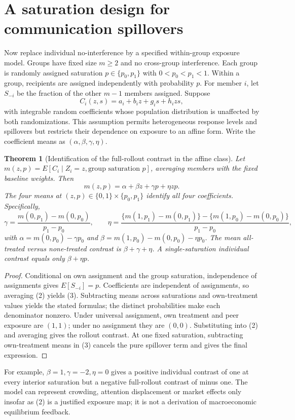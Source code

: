 \documentclass[11pt]{article}
\newtheorem{theorem}{Theorem}
\theoremstyle{definition}
\begin{document}
\section*{A saturation design for communication spillovers}
Now replace individual no-interference by a specified within-group exposure model. Groups have fixed size $m\ge2$ and no cross-group interference. Each group is randomly assigned saturation $p\in\{p_0,p_1\}$ with $0<p_0<p_1<1$. Within a group, recipients are assigned independently with probability $p$. For member $i$, let $S_{-i}$ be the fraction of the other $m-1$ members assigned. Suppose
\[
 C_i(z,s)=a_i+b_i z+g_i s+h_i zs,
 \tag{2}
\]
with integrable random coefficients whose population distribution is unaffected by both randomizations. This assumption permits heterogeneous response levels and spillovers but restricts their dependence on exposure to an affine form. Write the coefficient means as $(\alpha,\beta,\gamma,\eta)$.

\begin{theorem}[Identification of the full-rollout contrast in the affine class]
Let $m(z,p)=E[C_i\mid Z_i=z,\text{group saturation }p]$, averaging members with the fixed baseline weights. Then
\[
 m(z,p)=\alpha+\beta z+\gamma p+\eta zp.
 \tag{3}
\]
The four means at $(z,p)\in\{0,1\}\times\{p_0,p_1\}$ identify all four coefficients. Specifically,
\[
 \gamma=\frac{m(0,p_1)-m(0,p_0)}{p_1-p_0},\qquad
 \eta=\frac{\{m(1,p_1)-m(0,p_1)\}-\{m(1,p_0)-m(0,p_0)\}}{p_1-p_0},
\]
with $\alpha=m(0,p_0)-\gamma p_0$ and
$\beta=m(1,p_0)-m(0,p_0)-\eta p_0$.
The mean all-treated versus none-treated contrast is $\beta+\gamma+\eta$. A single-saturation individual contrast equals only $\beta+\eta p$.
\end{theorem}
\begin{proof}
Conditional on own assignment and the group saturation, independence of assignments gives $E[S_{-i}]=p$. Coefficients are independent of assignments, so averaging (2) yields (3). Subtracting means across saturations and own-treatment values yields the stated formulas; the distinct probabilities make each denominator nonzero. Under universal assignment, own treatment and peer exposure are $(1,1)$; under no assignment they are $(0,0)$. Substituting into (2) and averaging gives the rollout contrast. At one fixed saturation, subtracting own-treatment means in (3) cancels the pure spillover term and gives the final expression.
\end{proof}
For example, $\beta=1,\gamma=-2,\eta=0$ gives a positive individual contrast of one at every interior saturation but a negative full-rollout contrast of minus one. The model can represent crowding, attention displacement or market effects only insofar as (2) is a justified exposure map; it is not a derivation of macroeconomic equilibrium feedback.
\end{document}
